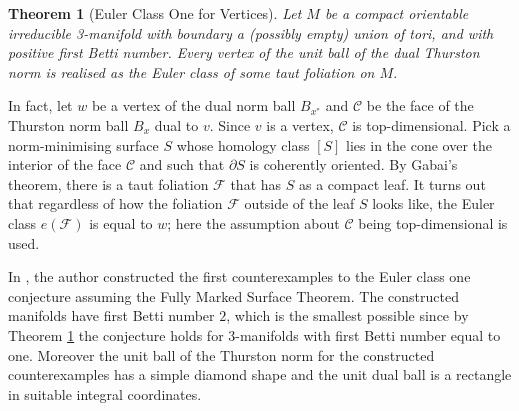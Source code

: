 \documentclass[11pt]{amsart}
\newtheorem{thm}{Theorem}[section]
\theoremstyle{remark}
\theoremstyle{definition}
\begin{document}
	\begin{thm}[Euler Class One for Vertices]
		Let $M$ be a compact orientable irreducible 3-manifold with boundary a (possibly empty) union of tori, and with positive first Betti number. Every vertex of the unit ball of the dual Thurston norm is realised as the Euler class of some taut foliation on $M$. 
		\label{thm:Gabai-euler class one for vertices}
	\end{thm}
	
	In fact, let $w$ be a vertex of the dual norm ball $B_{x^*}$ and $\mathcal{C}$ be the face of the Thurston norm ball $B_{x}$ dual to $v$. Since $v$ is a vertex, $\mathcal{C}$ is top-dimensional. Pick a norm-minimising surface $S$ whose homology class $[S]$ lies in the cone over the interior of the face $\mathcal{C}$ and such that $\partial S$ is coherently oriented. By Gabai's theorem, there is a taut foliation $\mathcal{F}$ that has $S$ as a compact leaf. It turns out that regardless of how the foliation $\mathcal{F}$ outside of the leaf $S$ looks like, the Euler class $e(\mathcal{F})$ is equal to $w$; here the assumption about $\mathcal{C}$ being top-dimensional is used. 
	
	
	
	In \cite{yazdi2020thurston}, the author constructed the first counterexamples to the Euler class one conjecture assuming the Fully Marked Surface Theorem. The constructed manifolds have first Betti number $2$, which is the smallest possible since by Theorem \ref{thm:Gabai-euler class one for vertices} the conjecture holds for 3-manifolds with first Betti number equal to one. Moreover the unit ball of the Thurston norm for the constructed counterexamples has a simple diamond shape and the unit dual ball is a rectangle in suitable integral coordinates. 
	
\end{document}

